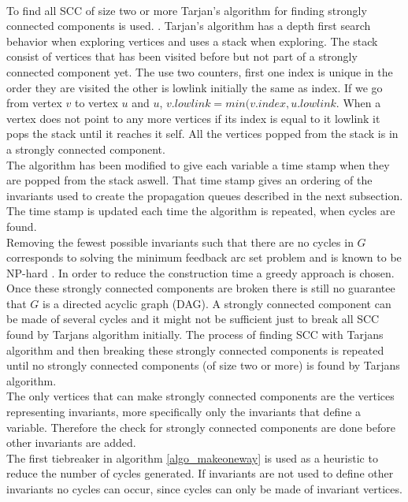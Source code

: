 \\  
To find all SCC of size two or more Tarjan's algorithm for finding strongly connected components is used. . Tarjan's algorithm has a depth first search behavior when exploring vertices and uses 
a stack when exploring. The stack consist of vertices that has been visited before but not part of a strongly 
connected component yet. The use two counters, first one index is unique in the order they are visited the other is 
lowlink initially the same as index. If we go from vertex $v$ to vertex $u$ and $u$, $v.lowlink = 
min(v.index,u.lowlink$. When a vertex does not point to any more vertices if its index is equal to it lowlink it pops 
the stack until it reaches it self. All the vertices popped from the stack is in a strongly connected component. \\
The algorithm has been modified to give each variable a time stamp when they are popped from the stack aswell. That 
time stamp gives an ordering of the invariants used to create the propagation queues described in the next subsection. 
The time stamp is updated each time the algorithm is repeated, when cycles are found. \\
Removing the fewest possible invariants such that there are no cycles in $G$ corresponds to solving the minimum 
feedback arc set problem and is known to be NP-hard \cite[p.9]{oscar}. In order to reduce the construction time a 
greedy approach is chosen. \\ 

Once these strongly connected components are broken there is still no guarantee that $G$ is a directed acyclic graph 
(DAG). A strongly connected component can be made of several cycles and it might not be sufficient just to break all 
SCC found by Tarjans algorithm initially. The process of finding SCC with Tarjans algorithm and then 
breaking these strongly connected components is repeated until no strongly connected components (of size two or more) 
is found by Tarjans algorithm. \medskip \\  
The only vertices that can make strongly connected components are the vertices representing invariants, more 
specifically only the invariants that define a variable. Therefore the check for strongly connected components are done 
before other invariants are added. \\ 
The first tiebreaker in algorithm \ref{algo_makeoneway} is used as a heuristic to reduce the number of cycles 
generated. If invariants are not used to define other invariants no cycles can occur, since cycles can only be made of 
invariant vertices. \\





